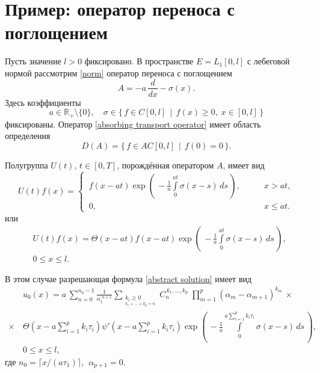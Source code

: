 \documentclass{article}
\renewcommand{\le}{\leqslant}
\renewcommand{\ge}{\geqslant}
\theoremstyle{definition}
\begin{document}
\newpage

\section{Пример: оператор переноса с поглощением}
Пусть значение $l > 0$ фиксировано. В пространстве \mbox{$E = L_1[0,l]$} с лебеговой нормой рассмотрим \eqref{norm} 
оператор переноса с поглощением
\begin{equation} \label{absorbing transport operator}
	A = -a\,\dfrac{d}{dx} - \sigma(x).
\end{equation}
Здесь коэффициенты 
\begin{equation*}
	a \in \mathbb{R}_+ \setminus \{0\}, \quad\sigma \in \{\, f \in C[0,l] \;\, | \;\, f(x) \ge 0, \; x \in [0,l] \,\}
\end{equation*}
фиксированы. Оператор \eqref{absorbing transport operator} имеет область определения 
\begin{equation*}
	D(A) = \{\, f \in AC[0,l] \;\, | \;\, f(0) = 0 \,\}.
\end{equation*}

Полугруппа $U(t),\, t \in [0,T]$, порождённая оператором $A$, имеет вид 
\begin{equation*}
U(t)f(x) = 
	\begin{cases}
		\,f(x - at)\exp\left(\, -\frac{1}{a}\int\limits_{0}^{at}\sigma(x - s) \,ds \,\right), & \qquad x > at, \\
		\,0, & \qquad x \le at.
	\end{cases}
\end{equation*}
или
\begin{equation}
\begin{aligned}
	& U(t)f(x) = \Theta(x - at)f(x - at)\exp\left(\, -\frac{1}{a}\int\limits_{0}^{at}\sigma(x - s) \,ds \,\right), \\[3mm]
	& 0 \le x \le l.
\end{aligned}	
\end{equation}

В этом случае разрешающая формула \eqref{abstract solution} имеет вид
\begin{equation} \label{non-homogenous solution}
\begin{aligned}
	& u_0(x) = a\,\sum\limits_{n = 0}^{n_0 - 1} \frac{1}{\alpha_1^{\,\,n + 1}}
	\sum\limits_{\substack{{k_i \ge 0} \\_{k_1 + ... + k_p = n}}}\!\!\!\!C_n^{\,k_1, ..., k_p}\; 
	\prod_{m = 1}^{p}(\alpha_m - \alpha_{m + 1})^{k_m} \,\times \\[2mm] \times\,
	& \Theta\!\left(x - a\sum\limits_{i = 1}^{p}k_i\tau_i \right)\psi'\!\left(x - a\sum\limits_{i = 1}^{p}k_i\tau_i\right)
	\exp\left(\, -\frac{1}{a}\int\limits_{0}^{a\sum\limits_{i = 1}^{p}k_i\tau_i}\sigma(x - s) \,ds \,\right), \\[3mm] 
	& 0 \le x \le l,
\end{aligned}
\end{equation}
где $n_0 = \lceil x / (a\tau_1) \rceil$, $\;\alpha_{p + 1} = 0$.
\end{document}
